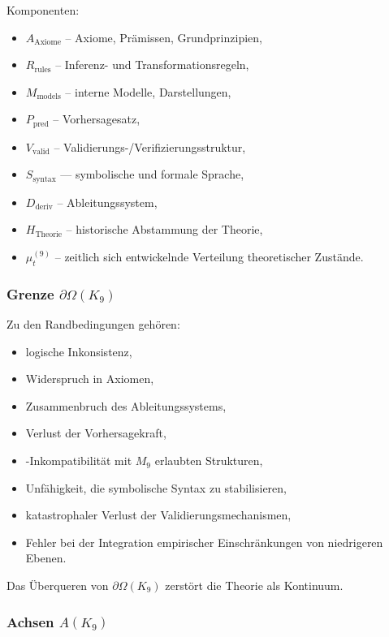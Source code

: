 Komponenten:
\begin{itemize}
    \item $A_{\mathrm{Axiome}}$ – Axiome, Prämissen, Grundprinzipien,
    \item $R_{\mathrm{rules}}$ – Inferenz- und Transformationsregeln,
    \item $M_{\mathrm{models}}$ – interne Modelle, Darstellungen,
    \item $P_{\mathrm{pred}}$ – Vorhersagesatz,
    \item $V_{\mathrm{valid}}$ – Validierungs-/Verifizierungsstruktur,
    \item $S_{\mathrm{syntax}}$ — symbolische und formale Sprache,
    \item $D_{\mathrm{deriv}}$ – Ableitungssystem,
    \item $H_{\mathrm{Theorie}}$ – historische Abstammung der Theorie,
    \item $\mu^{(9)}_t$ – zeitlich sich entwickelnde Verteilung theoretischer Zustände.
\end{itemize}

\subsubsection{Grenze \texorpdfstring{$\partial\Omega(K_9)$}{\partial\Omega(K_9)}}

Zu den Randbedingungen gehören:
\begin{itemize}
    \item logische Inkonsistenz,
    \item Widerspruch in Axiomen,
    \item Zusammenbruch des Ableitungssystems,
    \item Verlust der Vorhersagekraft,
    \item-Inkompatibilität mit $M_9$ erlaubten Strukturen,
    \item Unfähigkeit, die symbolische Syntax zu stabilisieren,
    \item katastrophaler Verlust der Validierungsmechanismen,
    \item Fehler bei der Integration empirischer Einschränkungen von niedrigeren Ebenen.
\end{itemize}

Das Überqueren von $\partial\Omega(K_9)$ zerstört die Theorie als Kontinuum.

\subsubsection{Achsen \texorpdfstring{$A(K_9)$}{A(K_9)}}

